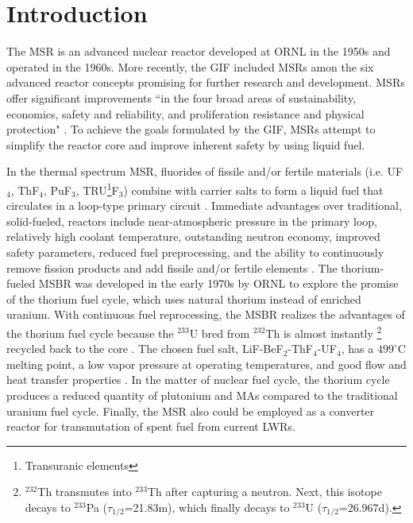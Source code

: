 \section{Introduction}
The \gls{MSR} is an advanced nuclear reactor developed at \gls{ORNL} 
in the 1950s and operated in the 1960s. More recently, the \gls{GIF} included 
\glspl{MSR} amon the six advanced reactor concepts promising for further 
research and development.
\glspl{MSR} offer significant improvements ``in the four broad areas of 
sustainability, economics, safety and reliability, and proliferation resistance 
and physical protection" \cite{doe_technology_2002}. To achieve the goals 
formulated by the GIF, \glspl{MSR} attempt to simplify the reactor core and 
improve inherent safety by using liquid fuel.

 In the thermal spectrum \gls{MSR}, fluorides of fissile and/or fertile 
 materials (i.e. UF$_4$, ThF$_4$,  PuF$_3$, TRU\footnote{ Transuranic 
 elements}F$_3$) combine with carrier salts to form a liquid fuel that 
 circulates in a loop-type primary circuit \cite{haubenreich_experience_1970}.  
 Immediate advantages over traditional, solid-fueled, reactors include 
 near-atmospheric pressure in the primary loop, 
 relatively high coolant temperature, outstanding neutron economy, improved 
 safety parameters, reduced fuel preprocessing, and the ability to 
 continuously remove fission products and add fissile and/or fertile elements 
 \cite{leblanc_molten_2010}. The thorium-fueled \gls{MSBR} was developed in the 
 early 1970s by \gls{ORNL} to explore the promise of the thorium 
 fuel cycle, which uses natural thorium instead of enriched uranium. With 
 continuous fuel reprocessing, the \gls{MSBR}
 realizes the advantages of the thorium fuel cycle because the $^{233}$U bred from 
 $^{232}$Th is almost instantly \footnote{\space $^{232}$Th transmutes into 
 $^{233}$Th after capturing a neutron. Next, this isotope decays to $^{233}$Pa 
 ($\tau_{1/2}$=21.83m), which finally decays to $^{233}$U 
 ($\tau_{1/2}$=26.967d).} recycled back to the core 
 \cite{betzler_modeling_2016}. The chosen fuel salt, 
 LiF-BeF$_2$-ThF$_4$-UF$_4$, has a $499^\circ$C melting point, a low vapor 
 pressure at operating temperatures, 
 and good flow and heat transfer properties \cite{robertson_conceptual_1971}. 
 In the matter of nuclear fuel cycle, the thorium cycle produces a reduced 
 quantity of plutonium and \glspl{MA} compared to the traditional uranium fuel 
 cycle. Finally, the \gls{MSR} also could be employed as a converter reactor 
 for transmutation of spent fuel from current \glspl{LWR}.

